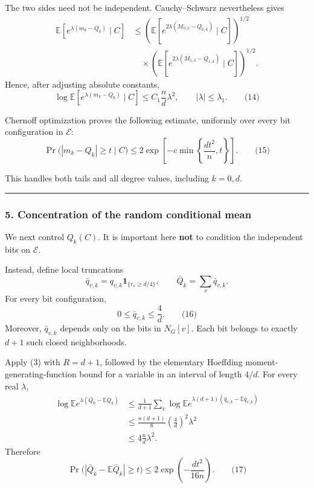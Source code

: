 \documentclass[
  11pt,
  a4paper,
]{article}
\begin{document}
The two sides need not be independent. Cauchy--Schwarz nevertheless
gives \begin{equation*}
\begin{aligned}
\mathbb E[e^{\lambda(m_k-Q_k)}\mid C]
&\le
\left(
\mathbb E[e^{2\lambda(M_{0,k}-Q_{0,k})}\mid C]
\right)^{1/2}\\
&\quad{}\times
\left(
\mathbb E[e^{2\lambda(M_{1,k}-Q_{1,k})}\mid C]
\right)^{1/2}.
\end{aligned}
\end{equation*} Hence, after adjusting absolute constants, \[
\log\mathbb E[e^{\lambda(m_k-Q_k)}\mid C]
\le C_1\frac nd\lambda^2,
\qquad |\lambda|\le\lambda_1.
\qquad\text{(14)}
\]

Chernoff optimization proves the following estimate, uniformly over
every bit configuration in \(\mathcal E\): \[
\Pr\bigl(|m_k-Q_k|\ge t\mid C\bigr)
\le
2\exp\left[
-c\min\left\{\frac{dt^2}{n},t\right\}
\right].
\qquad\text{(15)}
\]

This handles both tails and all degree values, including \(k=0,d\).

\begin{center}\rule{0.5\linewidth}{0.5pt}\end{center}

\subsubsection{5. Concentration of the random conditional
mean}\label{concentration-of-the-random-conditional-mean}

We next control \(Q_k(C)\). It is important here \textbf{not} to
condition the independent bits on \(\mathcal E\).

Instead, define local truncations \[
\bar q_{v,k}
=
q_{v,k}\mathbf 1_{\{r_v\ge d/4\}},
\qquad
\bar Q_k=\sum_v\bar q_{v,k}.
\] For every bit configuration, \[
0\le\bar q_{v,k}\le\frac4d.
\qquad\text{(16)}
\] Moreover, \(\bar q_{v,k}\) depends only on the bits in \(N_G[v]\).
Each bit belongs to exactly \(d+1\) such closed neighborhoods.

Apply (3) with \(R=d+1\), followed by the elementary Hoeffding
moment-generating-function bound for a variable in an interval of length
\(4/d\). For every real \(\lambda\), \begin{equation*}
\begin{aligned}
\log\mathbb E e^{\lambda(\bar Q_k-\mathbb E\bar Q_k)}
&\le
\frac1{d+1}\sum_v
\log\mathbb E
e^{\lambda(d+1)(\bar q_{v,k}-\mathbb E\bar q_{v,k})}\\
&\le
\frac{n(d+1)}8\left(\frac4d\right)^2\lambda^2\\
&\le
4\frac nd\lambda^2.
\end{aligned}
\end{equation*} Therefore \[
\Pr\bigl(|\bar Q_k-\mathbb E\bar Q_k|\ge t\bigr)
\le
2\exp\left(-\frac{dt^2}{16n}\right).
\qquad\text{(17)}
\]
\end{document}
